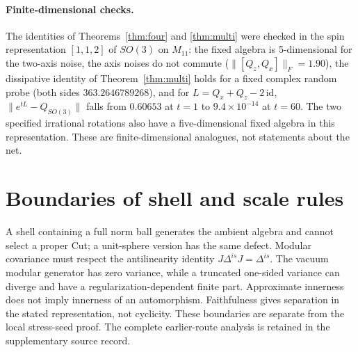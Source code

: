 \documentclass[12pt]{article}
\theoremstyle{definition}
\theoremstyle{remark}
\begin{document}
\paragraph{Finite-dimensional checks.} The identities of Theorems~\ref{thm:four} and
\ref{thm:multi} were checked in the spin representation \([1,1,2]\) of \(SO(3)\) on
\(M_{11}\): the fixed algebra is 5-dimensional for the two-axis noise, the axis noises
do not commute (\(\|[Q_z,Q_x]\|_F=1.90\)), the dissipative identity of
Theorem~\ref{thm:multi} holds for a fixed complex random probe
(both sides \(363.2646789268\)), and for \(L=Q_x+Q_z-2\,\mathrm{id}\),
\(\|e^{tL}-Q_{SO(3)}\|\) falls from \(0.60653\) at \(t=1\) to
\(9.4\times10^{-14}\) at \(t=60\). The two specified irrational rotations
also have a five-dimensional fixed algebra in this representation. These
are finite-dimensional analogues, not statements about the net.

\section{Boundaries of shell and scale rules}\label{app:july}

A shell containing a full norm ball generates the ambient algebra and
cannot select a proper Cut; a unit-sphere version has the same defect.
Modular covariance must respect the antilinearity identity
$J\Delta^{is}J=\Delta^{is}$. The vacuum modular generator has zero
variance, while a truncated one-sided variance can diverge and have a
regularization-dependent finite part. Approximate innerness does not
imply innerness of an automorphism. Faithfulness gives separation in
the stated representation, not cyclicity.
These boundaries are separate from the local stress-seed proof.
The complete earlier-route analysis is retained in the supplementary
source record.
\end{document}

